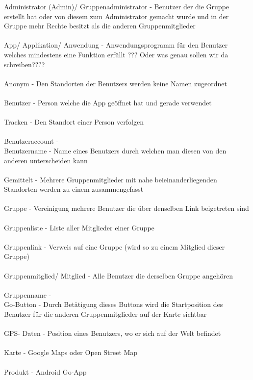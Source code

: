 Administrator (Admin)/ Gruppenadministrator - Benutzer der die Gruppe erstellt hat oder von diesem zum Administrator gemacht wurde und in der Gruppe mehr Rechte besitzt als die anderen Gruppenmitglieder\\
\\
App/ Applikation/ Anwendung - Anwendungsprogramm für den Benutzer welches mindestens eine Funktion erfüllt ??? Oder was genau sollen wir da schreiben????\\
\\
Anonym - Den Standorten der Benutzers werden keine Namen zugeordnet\\
\\
Benutzer - Person welche die App geöffnet hat und gerade verwendet\\
\\
Tracken - Den Standort einer Person verfolgen\\
\\
Benutzeraccount -
\\
Benutzername - Name eines Benutzers durch welchen man diesen von den anderen unterscheiden kann\\
\\
Gemittelt - Mehrere Gruppenmitglieder mit nahe beieinanderliegenden Standorten werden zu einem zusammengefasst\\
\\
Gruppe - Vereinigung mehrere Benutzer die über denselben Link beigetreten sind\\
\\
Gruppenliste - Liste aller Mitglieder einer Gruppe\\
\\
Gruppenlink - Verweis auf eine Gruppe (wird so zu einem Mitglied dieser Gruppe)\\
\\
Gruppenmitglied/ Mitglied - Alle Benutzer die derselben Gruppe angehören\\
\\
Gruppenname -
\\
Go-Button - Durch Betätigung dieses Buttons wird die Startposition des Benutzer für die anderen Gruppenmitglieder auf der Karte sichtbar\\
\\
GPS- Daten - Position eines Benutzers, wo er sich auf der Welt befindet\\
\\
Karte - Google Maps oder Open Street Map\\
\\
Produkt - Android Go-App\\
